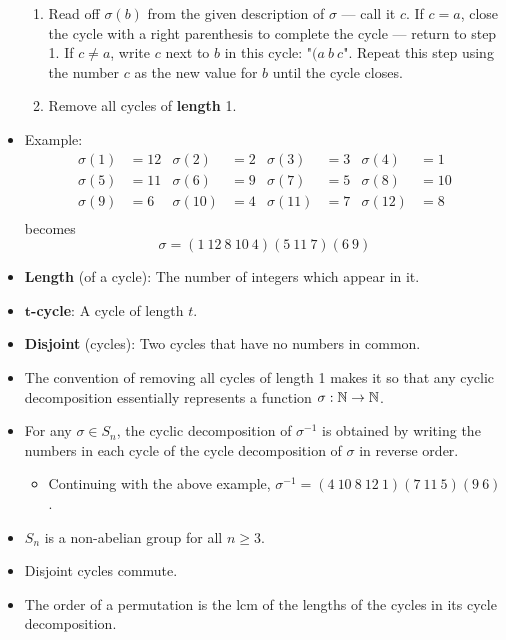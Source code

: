 \documentclass[../main.tex]{subfiles}
\begin{document}
\begin{itemize}
\begin{enumerate}
        \item Read off $\sigma(b)$ from the given description of $\sigma$ --- call it $c$. If $c=a$, close the cycle with a right parenthesis to complete the cycle --- return to step 1. If $c\neq a$, write $c$ next to $b$ in this cycle: "$(a\ b\ c$". Repeat this step using the number $c$ as the new value for $b$ until the cycle closes.
        \item Remove all cycles of \textbf{length} 1.
    \end{enumerate}
    \item Example:
    \begin{align*}
        \sigma(1) &= 12&
            \sigma(2) &= 2&
                \sigma(3) &= 3&
                    \sigma(4) &= 1\\
        \sigma(5) &= 11&
            \sigma(6) &= 9&
                \sigma(7) &= 5&
                    \sigma(8) &= 10\\
        \sigma(9) &= 6&
            \sigma(10) &= 4&
                \sigma(11) &= 7&
                    \sigma(12) &= 8\\
    \end{align*}
    becomes
    \begin{equation*}
        \sigma = (1\ 12\ 8\ 10\ 4)(5\ 11\ 7)(6\ 9)
    \end{equation*}
    \item \textbf{Length} (of a cycle): The number of integers which appear in it.
    \item \textbf{$\bm{t}$-cycle}: A cycle of length $t$.
    \item \textbf{Disjoint} (cycles): Two cycles that have no numbers in common.
    \item The convention of removing all cycles of length 1 makes it so that any cyclic decomposition essentially represents a function $\sigma:\mathbb{N}\to\mathbb{N}$.
    \item For any $\sigma\in S_n$, the cyclic decomposition of $\sigma^{-1}$ is obtained by writing the numbers in each cycle of the cycle decomposition of $\sigma$ in reverse order.
    \begin{itemize}
        \item Continuing with the above example, $\sigma^{-1}=(4\ 10\ 8\ 12\ 1)(7\ 11\ 5)(9\ 6)$.
    \end{itemize}
    \item $S_n$ is a non-abelian group for all $n\geq 3$.
    \item Disjoint cycles commute.
    \item The order of a permutation is the lcm of the lengths of the cycles in its cycle decomposition.
\end{itemize}
\end{document}
